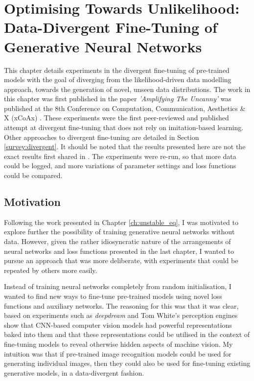 \chapter{Optimising Towards Unlikelihood: Data-Divergent Fine-Tuning of Generative Neural Networks}
\label{ch:divergent}

This chapter details experiments in the divergent fine-tuning of pre-trained models with the goal of diverging from the likelihood-driven data modelling approach, towards the generation of novel, unseen data distributions.
The work in this chapter was first published in the paper \textit{'Amplifying The Uncanny'} was published at the 8th Conference on Computation, Communication, Aesthetics \& X (xCoAx) \citep{broad2020amplifying}. 
These experiments were the first peer-reviewed and published attempt at divergent fine-tuning that does not rely on imitation-based learning. 
Other approaches to divergent fine-tuning are detailed in Section \ref{survey:divergent}. 
It should be noted that the results presented here are not the exact results first shared in \cite{broad2020amplifying}. 
The experiments were re-run, so that more data could be logged, and more variations of parameter settings and loss functions could be compared.

\section{Motivation}
\label{c4:sec:motivation}

Following the work presented in Chapter \ref{ch:unstable_eq}, I was motivated to explore further the possibility of training generative neural networks without data. 
However, given the rather idiosyncratic nature of the arrangements of neural networks and loss functions presented in the last chapter, I wanted to pursue an approach that was more deliberate, with experiments that could be repeated by others more easily. 

Instead of training neural networks completely from random initialisation, I wanted to find new ways to fine-tune pre-trained models using novel loss functions and auxiliary networks. 
The reasoning for this was that it was clear, based on experiments such as \textit{deepdream} \citep{mordvintsev2015inceptionism} and Tom White's perception engines \citep{white2018perception,white2019shared} show that CNN-based computer vision models had powerful representations baked into them and that these representations could be utilised in the context of fine-tuning models to reveal otherwise hidden aspects of machine vision.
My intuition was that if pre-trained image recognition models could be used for generating individual images, then they could also be used for fine-tuning existing generative models, in a data-divergent fashion.


